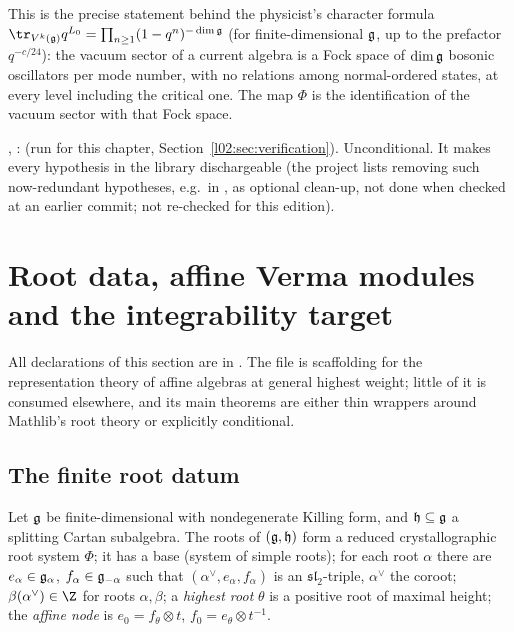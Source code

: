 \begin{physics}
This is the precise statement behind the physicist's character formula
$\tr_{V^k(\ltwog)}q^{L_0} = \prod_{n\ge1}(1-q^n)^{-\dim\ltwog}$ (for finite-dimensional $\mathfrak{g}$, up to the
prefactor $q^{-c/24}$): the vacuum sector of a current algebra is a Fock space of $\dim\mathfrak{g}$ bosonic
oscillators per mode number, with no relations among normal-ordered states, at every level including the
critical one. The map $\Phi$ is the identification of the vacuum sector with that Fock space.
\end{physics}

\begin{status}
, \allowbreak{}\allowbreak{}:  (run for this chapter, Section~\ref{l02:sec:verification}). Unconditional. It makes every
 hypothesis in the library dischargeable (the project lists removing such now-redundant
hypotheses, e.g.\ in , as optional clean-up, not done
when checked at an earlier commit; not re-checked for this edition).
\end{status}

\section{Root data, affine Verma modules and the integrability target}\label{l02:sec:roots}

All declarations of this section are in . The file
is scaffolding for the representation theory of affine algebras at general highest weight; little of
it is consumed elsewhere, and its main theorems are either thin wrappers around Mathlib's root theory or
explicitly conditional.

\subsection{The finite root datum}

\begin{definition}\label{l02:def:roots}
Let $\mathfrak{g}$ be finite-dimensional with nondegenerate Killing form, and $\mathfrak h\subseteq\mathfrak{g}$ a
splitting Cartan subalgebra. The roots of $(\mathfrak{g},\mathfrak h)$ form a reduced crystallographic root
system $\Phi$; it has a base (system of simple roots); for each root $\alpha$ there are $e_\alpha\in\mathfrak{g}_\alpha$,
$f_\alpha\in\mathfrak{g}_{-\alpha}$ such that $(\alpha^\vee, e_\alpha, f_\alpha)$ is an $\mathfrak{sl}_2$-triple, $\alpha^\vee$ the
coroot; $\beta(\alpha^\vee)\in\Z$ for roots $\alpha,\beta$; a \emph{highest root} $\theta$ is a positive root of
maximal height; the \emph{affine node} is $e_0 = f_\theta\otimes t$, $f_0 = e_\theta\otimes t^{-1}$.
\end{definition}

